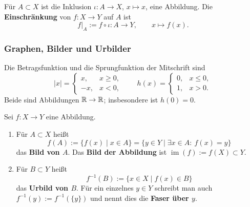\begin{definition}[Einschränkung]
Für $A\subset X$ ist die Inklusion $\iota:A\to X$, $x\mapsto x$,
eine Abbildung. Die \textbf{Einschränkung} von $f:X\to Y$ auf $A$ ist
\[
    f|_A:=f\circ\iota:A\to Y,\qquad x\mapsto f(x).
\]
\end{definition}

\subsubsection*{Graphen, Bilder und Urbilder}
\begin{beispiel}
Die Betragsfunktion und die Sprungfunktion der Mitschrift sind
\[
    |x|=\begin{cases}x,&x\ge0,\\-x,&x<0,\end{cases}
    \qquad
    h(x)=\begin{cases}0,&x\le0,\\1,&x>0.\end{cases}
\]
Beide sind Abbildungen $\mathbb{R}\to\mathbb{R}$; insbesondere ist $h(0)=0$.
\begin{center}
\hspace{1.2cm}
\end{center}
\end{beispiel}

\begin{definition}
Sei $f:X\to Y$ eine Abbildung.
\begin{enumerate}
    \item Für $A\subset X$ heißt
    \[
        f(A):=\{f(x)\mid x\in A\}
        =\{y\in Y\mid\exists x\in A:\ f(x)=y\}
    \]
    das \textbf{Bild von $A$}. Das \textbf{Bild der Abbildung} ist
    $\operatorname{im}(f):=f(X)\subset Y$.
    \item Für $B\subset Y$ heißt
    \[
        f^{-1}(B):=\{x\in X\mid f(x)\in B\}
    \]
    das \textbf{Urbild von $B$}.
    Für ein einzelnes $y\in Y$ schreibt man auch
    $f^{-1}(y):=f^{-1}(\{y\})$ und nennt dies die \textbf{Faser über $y$}.
\end{enumerate}
\end{definition}

